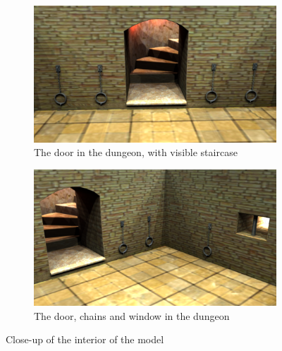 \begin{figure}[h!]
    \centering
    \begin{subfigure}[h!]{0.7\textwidth}
    	\centering
        \includegraphics[width=\textwidth]{figures/interior0.png}
        \caption{The door in the dungeon, with visible staircase}\label{fig:interior0}
    \end{subfigure}
    \begin{subfigure}[h!]{0.7\textwidth}
    	\centering
        \includegraphics[width=\textwidth]{figures/interior1.png}
        \caption{The door, chains and window in the dungeon}\label{fig:interior1}
    \end{subfigure}
    \caption{Close-up of the interior of the model}\label{interior}
\end{figure}



